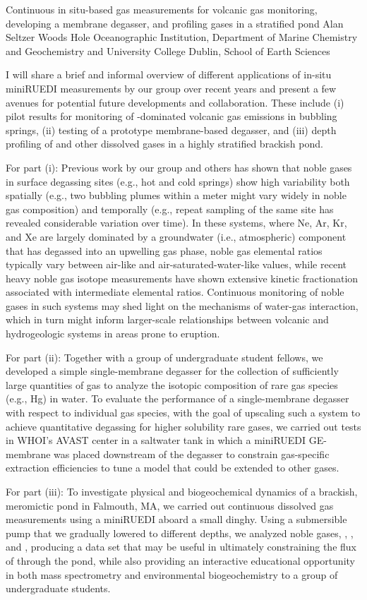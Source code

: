 \begin{conf-abstract}
{Continuous in situ-based gas measurements for volcanic gas monitoring, developing a membrane degasser, and profiling gases in a stratified pond}
{Alan Seltzer}
{Woods Hole Oceanographic Institution, Department of Marine Chemistry and Geochemistry and University College Dublin, School of Earth Sciences}
{I will share a brief and informal overview of different applications of in-situ miniRUEDI measurements by our group over recent years and present a few avenues for potential future developments and collaboration. These include (i) pilot results for monitoring of -dominated volcanic gas emissions in bubbling springs, (ii) testing of a prototype membrane-based degasser, and (iii) depth profiling of  and other dissolved gases in a highly stratified brackish pond.

For part (i): Previous work by our group and others has shown that noble gases in surface  degassing sites (e.g., hot and cold springs) show high variability both spatially (e.g., two bubbling plumes within a meter might vary widely in noble gas composition) and temporally (e.g., repeat sampling of the same site has revealed considerable variation over time). In these systems, where Ne, Ar, Kr, and Xe are largely dominated by a groundwater (i.e., atmospheric) component that has degassed into an upwelling  gas phase, noble gas elemental ratios typically vary between air-like and air-saturated-water-like values, while recent heavy noble gas isotope measurements have shown extensive kinetic fractionation associated with intermediate elemental ratios. Continuous monitoring of noble gases in such systems may shed light on the mechanisms of water-gas interaction, which in turn might inform larger-scale relationships between volcanic and hydrogeologic systems in areas prone to eruption.

For part (ii): Together with a group of undergraduate student fellows, we developed a simple single-membrane degasser for the collection of sufficiently large quantities of gas to analyze the isotopic composition of rare gas species (e.g., Hg) in water. To evaluate the performance of a single-membrane degasser with respect to individual gas species, with the goal of upscaling such a system to achieve quantitative degassing for higher solubility rare gases, we carried out tests in WHOI’s AVAST center in a saltwater tank in which a miniRUEDI GE-membrane was placed downstream of the degasser to constrain gas-specific extraction efficiencies to tune a model that could be extended to other gases.

For part (iii): To investigate physical and biogeochemical dynamics of a brackish, meromictic pond in Falmouth, MA, we carried out continuous dissolved gas measurements using a miniRUEDI aboard a small dinghy. Using a submersible pump that we gradually lowered to different depths, we analyzed noble gases, , , and , producing a data set that may be useful in ultimately constraining the flux of  through the pond, while also providing an interactive educational opportunity in both mass spectrometry and environmental biogeochemistry to a group of undergraduate students.}
\end{conf-abstract}
